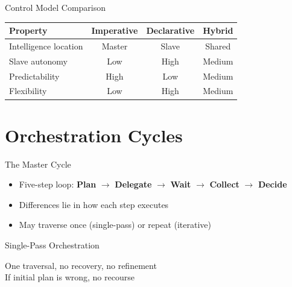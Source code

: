 \documentclass[aspectratio=169]{beamer}
\begin{document}
\begin{frame}{Control Model Comparison}
\centering
\begin{tabular}{lccc}
\toprule
\textbf{Property} & \textbf{Imperative} & \textbf{Declarative} & \textbf{Hybrid} \\
\midrule
Intelligence location & Master & Slave & Shared \\
Slave autonomy & Low & High & Medium \\
Predictability & High & Low & Medium \\
Flexibility & Low & High & Medium \\
\bottomrule
\end{tabular}
\end{frame}

\section{Orchestration Cycles}

\begin{frame}{The Master Cycle}
\begin{itemize}
    \item Five-step loop: \textbf{Plan} $\to$ \textbf{Delegate} $\to$ \textbf{Wait} $\to$ \textbf{Collect} $\to$ \textbf{Decide}
    \item Differences lie in how each step executes
    \item May traverse once (single-pass) or repeat (iterative)
\end{itemize}
\end{frame}

\begin{frame}{Single-Pass Orchestration}
\centering
{}

\vspace{0.5cm}
One traversal, no recovery, no refinement\\
If initial plan is wrong, no recourse
\end{frame}
\end{document}
